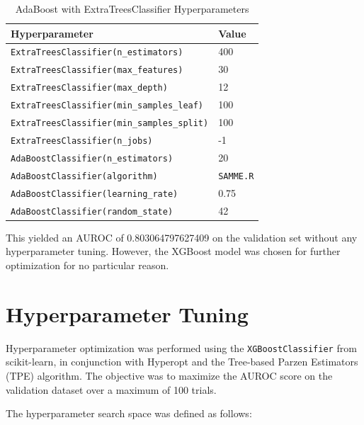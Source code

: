 \documentclass[letterpaper]{article}
\begin{document}
	\begin{table}[H]
		\centering
		\caption{AdaBoost with ExtraTreesClassifier Hyperparameters}
		\begin{tabular}{ll}
			\hline
			Hyperparameter & Value \\
			\hline
			\texttt{ExtraTreesClassifier(n\_estimators)} & 400 \\
			\texttt{ExtraTreesClassifier(max\_features)} & 30 \\
			\texttt{ExtraTreesClassifier(max\_depth)} & 12 \\
			\texttt{ExtraTreesClassifier(min\_samples\_leaf)} & 100 \\
			\texttt{ExtraTreesClassifier(min\_samples\_split)} & 100 \\
			\texttt{ExtraTreesClassifier(n\_jobs)} & -1 \\
			\texttt{AdaBoostClassifier(n\_estimators)} & 20 \\
			\texttt{AdaBoostClassifier(algorithm)} & \texttt{SAMME.R} \\
			\texttt{AdaBoostClassifier(learning\_rate)} & 0.75 \\
			\texttt{AdaBoostClassifier(random\_state)} & 42 \\
			\hline
		\end{tabular}
		\label{tab:adaboost_params}
	\end{table}
	
	This yielded an AUROC of 0.803064797627409 on the validation set without any hyperparameter tuning. However, the XGBoost model was chosen for further optimization for no particular reason.
	
	\section{Hyperparameter Tuning}
	
	Hyperparameter optimization was performed using the \texttt{XGBoostClassifier} from scikit-learn, in conjunction with Hyperopt and the Tree-based Parzen Estimators (TPE) algorithm. The objective was to maximize the AUROC score on the validation dataset over a maximum of 100 trials.
	
	The hyperparameter search space was defined as follows:
	
\end{document}
